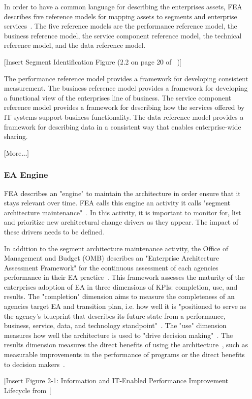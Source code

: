 In order to have a common language for describing the enterprises assets, FEA describes five reference models for mapping assets to segments and enterprise services~\cite{FederalEnterpriseArchitectureProgramManagementOffice}. The five reference models are the performance reference model, the business reference model, the service component reference model, the technical reference model, and the data reference model. 

[Insert Segment Identification Figure (2.2 on page 20 of ~\cite{FederalEnterpriseArchitectureProgramManagementOffice})]

The performance reference model provides a framework for developing consistent measurement. The business reference model provides a framework for developing a functional view of the enterprises line of business. The service component reference model provides a framework for describing how the services offered by IT systems support business functionality.  The data reference model provides a framework for describing data in a consistent way that enables enterprise-wide sharing. 


[More...]

\subsubsection{EA Engine}

FEA describes an "engine" to maintain the architecture in order ensure that it stays relevant over time. FEA calls this engine an activity it calls "segment architecture maintenance"~\cite{FederalEnterpriseArchitectureProgramManagementOffice}. In this activity, it is important to monitor for, list and prioritize new architectural change drivers as they appear. The impact of these drivers needs to be defined. 



In addition to the segment architecture maintenance activity, the Office of Management and Budget (OMB) describes an "Enterprise Architecture Assessment Framework" for the continuous assessment of each agencies performance in their EA practice~\cite{OfficeofManagementandBudget}. This framework assesses the maturity of the enterprises adoption of EA in three dimensions of KPIs: completion, use, and results. The "completion" dimension aims to measure the completeness of an agencies target EA and transition plan, i.e. how well it is "positioned to serve  as the agency's blueprint that describes its future state from a performance, business, service, data, and technology standpoint"~\cite{OfficeofManagementandBudget}. The "use" dimension measures how well the architecture is used to "drive decision making"~\cite{sessions2007}. The results dimension measures the direct benefits of using the architecture~\cite{sessions2007}, such as measurable improvements in the performance of programs or the direct benefits to decision makers~\cite{OfficeofManagementandBudget}. 

[Insert Figure 2-1: Information and IT-Enabled Performance Improvement Lifecycle from~\cite{OfficeofManagementandBudget}]


    

